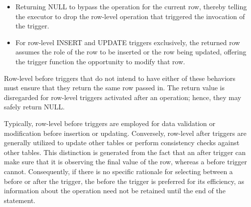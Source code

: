 \begin{itemize}
    \item Returning NULL to bypass the operation for the current row, thereby telling the executor to drop the row-level operation that triggered the invocation of the trigger.

    \item For row-level INSERT and UPDATE triggers exclusively, the returned row assumes the role of the row to be inserted or the row being updated, offering the trigger function the opportunity to modify that row.
\end{itemize}

Row-level before triggers that do not intend to have either of these behaviors must ensure that they return the same row passed in. The return value is disregarded for row-level triggers activated after an operation; hence, they may safely return NULL.

Typically, row-level before triggers are employed for data validation or modification before insertion or updating. Conversely, row-level after triggers are generally utilized to update other tables or perform consistency checks against other tables. This distinction is generated from the fact that an after trigger can make sure that it is observing the final value of the row, whereas a before trigger cannot. Consequently, if there is no specific rationale for selecting between a before or after the trigger, the before the trigger is preferred for its efficiency, as information about the operation need not be retained until the end of the statement.



